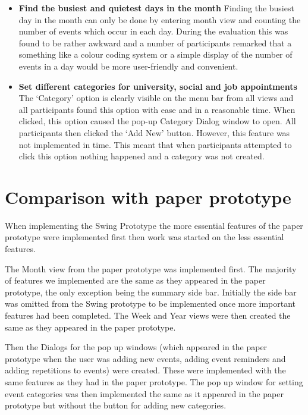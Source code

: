 \documentclass{article}
\begin{document}
\begin{itemize}
\item \textbf{Find the busiest and quietest days in the month}
Finding the busiest day in the month can only be done by entering month
view and counting the number of events which occur in each day. During
the evaluation this was found to be rather awkward and a number of
participants remarked that a something like a colour coding system or a
simple display of the number of events in a day would be more
user-friendly and convenient.
\item \textbf{Set different categories for university, social and job appointments}
The `Category' option is clearly visible on the menu bar from all views
and all participants found this option with ease and in a reasonable
time. When clicked, this option caused the pop-up Category Dialog window
to open. All participants then clicked the `Add New' button. However,
this feature was not implemented in time. This meant that when
participants attempted to click this option nothing happened and a
category was not created.
\end{itemize}


\section{Comparison with paper prototype}

When implementing the Swing Prototype the more essential features of the
paper prototype were implemented first then work was started on the less
essential features.

The Month view from the paper prototype was implemented first. The
majority of features we implemented are the same as they appeared in the
paper prototype, the only exception being the summary side bar.
Initially the side bar was omitted from the Swing prototype to be
implemented once more important features had been completed.
The Week and Year views were then created the same as they appeared in 
the paper prototype.

Then the Dialogs for the pop up windows (which appeared in the paper
prototype when the user was adding new events, adding event
reminders and adding repetitions to events) were created. These were
implemented with the same features as they had in the paper prototype. 
The pop up window for setting event categories was then implemented the
same as it appeared in the paper prototype but without the button for 
adding new categories.
\end{document}
